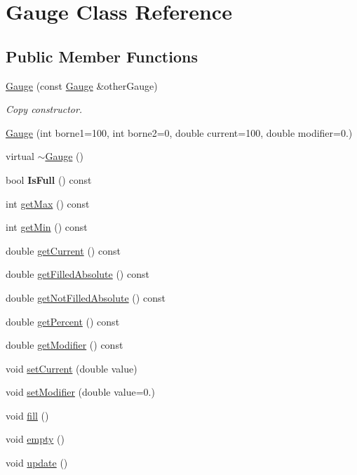 \hypertarget{class_gauge}{}\section{Gauge Class Reference}
\label{class_gauge}
\subsection*{Public Member Functions}
\begin{DoxyCompactItemize}
\item 
\hyperlink{class_gauge_a0c464af6a463abc4f646822d26072255}{Gauge} (const \hyperlink{class_gauge}{Gauge} \&other\+Gauge)
\begin{DoxyCompactList}\small\item\em Copy constructor. \end{DoxyCompactList}\item 
\hyperlink{class_gauge_aadee8ec19df78a3c8e2b5284567d8686}{Gauge} (int borne1=100, int borne2=0, double current=100, double modifier=0.)
\item 
virtual \hyperlink{class_gauge_aa125f240fc349172e61626a8d8914b74}{$\sim$\+Gauge} ()
\item 
bool {\bfseries Is\+Full} () const \hypertarget{class_gauge_a9d21b1035f0f1eefe3422ac622648c90}{}\label{class_gauge_a9d21b1035f0f1eefe3422ac622648c90}

\item 
int \hyperlink{class_gauge_ae278058b7cb17c746550522a0d452c41}{get\+Max} () const 
\item 
int \hyperlink{class_gauge_a9fd3cc038eb7c9ca6cbca3e0ea72fd12}{get\+Min} () const 
\item 
double \hyperlink{class_gauge_a3c489b4ba680aa40fc4e43bdc06035fd}{get\+Current} () const 
\item 
double \hyperlink{class_gauge_aa2b2abbd25dcab2e0cd44e61e78959a2}{get\+Filled\+Absolute} () const 
\item 
double \hyperlink{class_gauge_aba1c324da15a054dd7a0811dfe1fd447}{get\+Not\+Filled\+Absolute} () const 
\item 
double \hyperlink{class_gauge_af11d1954655aa1b899afe7d3631c42b5}{get\+Percent} () const 
\item 
double \hyperlink{class_gauge_a205e5ac44a3665a3ba3d2c1731f8c55c}{get\+Modifier} () const 
\item 
void \hyperlink{class_gauge_a36b459e95f5eb1d5ede5bf4159e2ad3a}{set\+Current} (double value)
\item 
void \hyperlink{class_gauge_a3e37f13101672e8f063bf8c7505215a4}{set\+Modifier} (double value=0.)
\item 
void \hyperlink{class_gauge_a9e5a18eb968c6b0ef93ba0fa54e6ee3d}{fill} ()
\item 
void \hyperlink{class_gauge_a8a6aa2631b3c91ddda499e3b4a4fc9c9}{empty} ()
\item 
void \hyperlink{class_gauge_ac84a9ad4758b97a9eb4f470770faf181}{update} ()
\end{DoxyCompactItemize}
